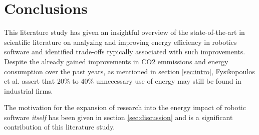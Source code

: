 \section{Conclusions}\label{sec:conclusions}
This literature study has given an insightful overview of the state-of-the-art in scientific literature on analyzing and improving 
energy efficiency in robotics software and identified trade-offs typically associated with such improvements.
Despite the already gained improvements in CO2 emmissions and energy consumption over the past years, as mentioned in section \ref{sec:intro}, 
Fysikopoulos et al. \cite{fysikopoulos2012automotive_energy_consumption} assert that 20\% to 40\% unnecessary use of energy may 
still be found in industrial firms.

The motivation for the expansion of research into the energy impact of robotic software \textit{itself} has been given in section \ref{sec:discussion}
and is a significant contribution of this literature study.